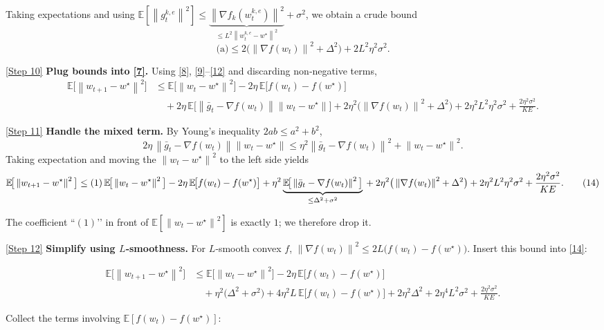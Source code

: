 \documentclass[11pt]{article}
\newcommand{\E}{\mathbb{E}}
\newcommand{\norm}[1]{\left\lVert#1\right\rVert}
\begin{document}
Taking expectations and using $\E[\norm{g_{t}^{k,e}}^2]\le
\underbrace{\norm{\nabla f_k(w_{t}^{k,e})}^2}_{\le L^2\norm{w_{t}^{k,e}-w^\star}^2}
+\sigma^2$, we obtain a crude bound
\[
\text{(a)}\le 2\big(\norm{\nabla f(w_t)}^2+\Delta^2\big)
+2L^2\eta^2\sigma^2 . \tag{12}
\]

\noindent\underline{[Step 10]} \textbf{Plug bounds into \eqref{7}.}  
Using \eqref{8}, \eqref{9}–\eqref{12} and discarding non‑negative terms,
\[
\begin{aligned}
\E\!\big[\norm{w_{t+1}-w^\star}^2\big]
&\le \E\!\big[\norm{w_t-w^\star}^2\big]
-2\eta\,\E\!\big[f(w_t)-f(w^\star)\big] \\
&\quad +2\eta\,\E\!\big[\norm{\bar g_t-\nabla f(w_t)}\norm{w_t-w^\star}\big]
+2\eta^2\big(\norm{\nabla f(w_t)}^2+\Delta^2\big)
+2\eta^2L^2\eta^2\sigma^2
+\frac{2\eta^2\sigma^2}{K E}. \tag{13}
\end{aligned}
\]

\noindent\underline{[Step 11]} \textbf{Handle the mixed term.}  
By Young’s inequality $2ab\le a^2+b^2$,
\[
2\eta\,\norm{\bar g_t-\nabla f(w_t)}\norm{w_t-w^\star}
\le \eta^2\norm{\bar g_t-\nabla f(w_t)}^2+\norm{w_t-w^\star}^2 .
\]
Taking expectation and moving the $\norm{w_t-w^\star}^2$ to the left side yields
\[
\E\!\big[\norm{w_{t+1}-w^\star}^2\big]
\le (1)\,\E\!\big[\norm{w_t-w^\star}^2\big]
-2\eta\,\E\!\big[f(w_t)-f(w^\star)\big]
+ \eta^2\underbrace{\E\!\big[\norm{\bar g_t-\nabla f(w_t)}^2\big]}_{\le \Delta^2+\sigma^2} \\
+2\eta^2\big(\norm{\nabla f(w_t)}^2+\Delta^2\big)
+2\eta^2L^2\eta^2\sigma^2
+\frac{2\eta^2\sigma^2}{K E}. \tag{14}
\]

The coefficient ``$(1)$’’ in front of $\E[\norm{w_t-w^\star}^2]$ is exactly $1$; we therefore drop it.

\noindent\underline{[Step 12]} \textbf{Simplify using $L$‑smoothness.}  
For $L$‑smooth convex $f$, $\norm{\nabla f(w_t)}^2\le 2L\big(f(w_t)-f(w^\star)\big)$.  
Insert this bound into \eqref{14}:

\[
\begin{aligned}
\E\!\big[\norm{w_{t+1}-w^\star}^2\big]
&\le \E\!\big[\norm{w_t-w^\star}^2\big]
-2\eta\,\E\!\big[f(w_t)-f(w^\star)\big] \\
&\quad +\eta^2\big(\Delta^2+\sigma^2\big)
+4\eta^2 L\,\E\!\big[f(w_t)-f(w^\star)\big]
+2\eta^2\Delta^2
+2\eta^4L^2\sigma^2
+\frac{2\eta^2\sigma^2}{K E}. \tag{15}
\end{aligned}
\]

Collect the terms involving $\E[f(w_t)-f(w^\star)]$:
\end{document}
